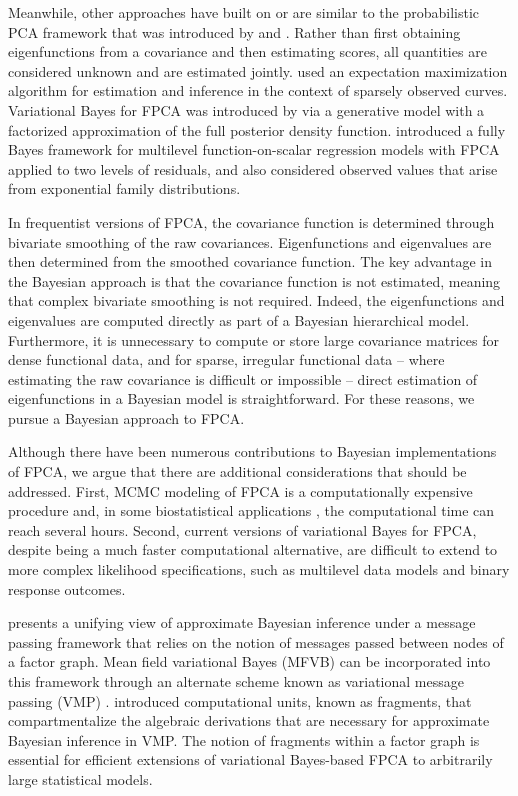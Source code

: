 \documentclass[12pt]{article}
\theoremstyle{plain}
\theoremstyle{definition}
\theoremstyle{remark}
\begin{document}
Meanwhile, other approaches have built on or are similar to the probabilistic PCA framework that was introduced by  and . Rather than first obtaining eigenfunctions from a covariance and then estimating scores, all quantities are considered unknown and are estimated jointly.   used an expectation maximization algorithm for estimation and inference in the context of sparsely observed curves. Variational Bayes for FPCA was introduced by  via a generative model with a factorized approximation of the full posterior density function.  introduced a fully Bayes framework for multilevel function-on-scalar
regression models with FPCA applied to two levels of residuals,
and also considered observed values that arise from exponential family distributions. 

In frequentist versions of FPCA, the covariance function is determined through bivariate smoothing of the raw
covariances. Eigenfunctions and eigenvalues are then determined from the smoothed covariance function.
The key advantage in the Bayesian approach is that the covariance function is not estimated, meaning that
complex bivariate smoothing is not required. Indeed, the eigenfunctions and eigenvalues are computed directly
as part of a Bayesian hierarchical model. Furthermore, it is unnecessary to compute or store large covariance matrices for dense functional data, and for sparse, irregular functional data -- where estimating the raw covariance is difficult or impossible -- direct estimation of eigenfunctions in a Bayesian model is straightforward. For these reasons, we pursue a Bayesian approach to FPCA.

Although there have been numerous contributions to Bayesian implementations of FPCA, we argue that there are
additional considerations that should be addressed. First, MCMC modeling of FPCA is a computationally expensive
procedure and, in some biostatistical applications \cite{Goldsmith15}, the computational time can reach several
hours. Second, current versions of variational Bayes for FPCA, despite being a much faster computational alternative,
are difficult to extend to more complex likelihood specifications, such as multilevel data models and binary response
outcomes.

 presents a unifying view of approximate Bayesian inference under a message passing framework
that relies on the notion of messages passed between nodes of a factor graph. Mean field variational Bayes (MFVB)
\cite{ormerod10, blei17}
can be incorporated into this framework through an alternate scheme known as variational message passing (VMP)
\cite{winn05}.  introduced computational units, known as fragments, that compartmentalize
the algebraic derivations that are necessary for approximate Bayesian inference in VMP. The notion of fragments
within a factor graph is essential for efficient extensions of variational Bayes-based FPCA to arbitrarily large statistical
models.
\end{document}

